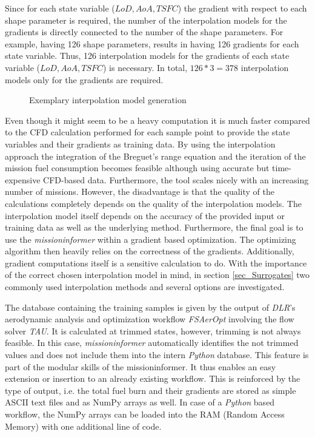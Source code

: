 Since for each state variable ($LoD, AoA, TSFC$) the gradient with 
respect to each shape parameter is required, the number of the 
interpolation models for the gradients is directly connected
to the number of 
the shape parameters. For example, having 126 shape parameters, 
results in having 126 gradients for each state variable. Thus,
126 interpolation models for the gradients of each state variable
($LoD, AoA, TSFC$) 
is necessary. In total, $126*3 = 378$ interpolation models only 
for the gradients are required.\newline 

\begin{figure}[!h]
    \def\svgwidth{\linewidth}
    
    \caption{Exemplary interpolation model generation}
    \label{fig_2_Lod_Interpol}
\end{figure}

Even though it might seem to be a heavy computation it 
is much faster compared to the 
CFD calculation performed for each sample point 
to provide the state variables 
and their gradients as training data.
By using the interpolation approach the integration of 
the Breguet's range equation and the iteration 
of the mission fuel consumption 
becomes feasible although using 
accurate but time-expensive CFD-based data. Furthermore,
the tool 
scales nicely with an increasing number of 
missions.
However, 
the disadvantage is that the quality of the calculations 
completely depends on the quality of the interpolation models. The 
interpolation model itself depends on the accuracy of 
the provided input or training data as well as the 
underlying method. Furthermore, 
the final goal is to use the \emph{missioninformer} within a 
gradient based optimization. The optimizing algorithm then 
heavily relies on the correctness of the gradients. 
Additionally, gradient computations itself is a sensitive 
calculation to do. With the importance of the correct chosen 
interpolation model in mind, in section \ref{sec_Surrogates}
two commonly used interpolation methods and several options are investigated.
\newline


The database containing the training samples 
is given by the output of \emph{DLR}'s aerodynamic analysis and 
optimization workflow \emph{FSAerOpt} 
\cite{merle_high-fidelity_2019} involving the 
flow solver \emph{TAU}.
It is calculated at trimmed states, however, trimming is not always
feasible. 
In this case, \emph{missioninformer} automatically identifies the not 
trimmed values and does not include them into the intern \emph{Python} 
database. This feature is part of the modular skills of the 
missioninformer. It thus enables an easy extension or insertion 
to an already existing workflow. This is reinforced by the type of output, 
i.e. the total fuel burn and their gradients are stored as simple ASCII text files 
and as NumPy arrays as well. In case of a \emph{Python} based 
workflow, the NumPy 
arrays can be loaded into the RAM (Random Access Memory)
with one additional line of code. 

